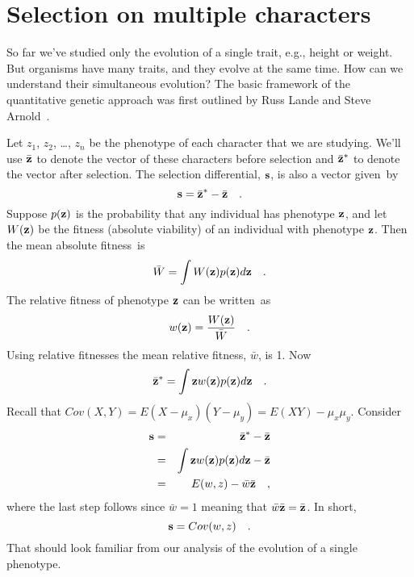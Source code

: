 \chapter{Selection on multiple characters}

So far we've studied only the evolution of a single trait, e.g.,
height or weight. But organisms have many traits, and they evolve at
the same time. How can we understand their simultaneous evolution? The
basic framework of the quantitative genetic approach was first
outlined by Russ Lande and Steve
Arnold~\cite{Lande-Arnold-1983}.

Let $z_1$, $z_2$, \dots, $z_n$ be the phenotype of each character that
we are studying. We'll use $\bar{\bf z}$ to denote the vector of these
characters before selection and $\bar{\bf z}^*$ to denote the vector after
selection. The selection differential, $\bf s$, is also a vector
given~by
\[
{\bf s} = \bar{\bf z}^* - \bar{\bf z} \quad .
\]
Suppose $p({\bf z})$ is the probability that any individual has
phenotype $\bf z$, and let $W({\bf z})$ be the fitness (absolute
viability) of an individual with phenotype $\bf z$. Then the mean
absolute fitness~is
\[
\bar W = \int W({\bf z})p({\bf z})d{\bf z} \quad .
\]
The relative fitness of phenotype $\bf z$ can be written~as
\[
w({\bf z}) = {W({\bf z}) \over \bar W} \quad .
\]
Using relative fitnesses the mean relative fitness, $\bar w$, is
1. Now
\[
\bar{\bf z}^* = \int {\bf z}w({\bf z})p({\bf z})d{\bf z} \quad .
\]
Recall that $Cov(X,Y) = E(X - \mu_x)(Y - \mu_y) = E(XY) -
\mu_x\mu_y$. Consider 
\begin{eqnarray*}
{\bf s} &=& \bar{\bf z}^* - \bar{\bf z} \\
        &=& \int {\bf z}w({\bf z})p({\bf z})d{\bf z} - \bar {\bf z} \\
        &=& E(w,z) - \bar w\bar {\bf z} \quad ,
\end{eqnarray*}
where the last step follows since $\bar w = 1$ meaning that $\bar
w\bar{\bf z} = \bar{\bf z}$. In short, 
\[
{\bf s} = Cov(w,z) \quad .
\]
That should look familiar from our analysis of the evolution of a
single phenotype.

